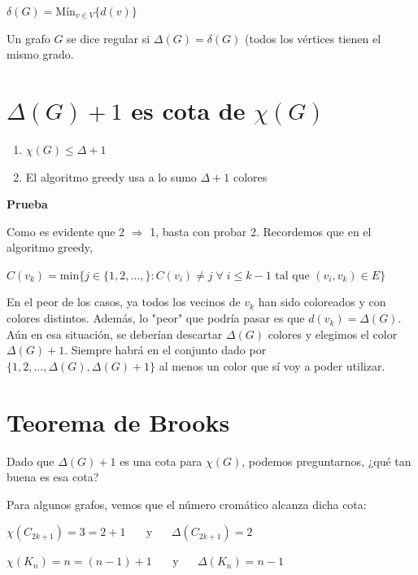 \documentclass[10pt,a4paper]{article}
\begin{document}
\begin{center}
$\delta(G) = \text{Mín}_{v \in V}\{d(v)\}$
\end{center}

Un grafo $G$ se dice regular si $\Delta(G) = \delta(G)$ (todos los vértices tienen el mismo grado.

\section*{$\Delta(G) + 1$ es cota de $\chi(G)$}

\begin{enumerate}

	\item $\chi(G) \leq \Delta + 1$
	\item El algoritmo greedy usa a lo sumo $\Delta + 1$ colores
\end{enumerate}

\textbf{Prueba}

Como es evidente que 2 $\Rightarrow$ 1, basta con probar 2. Recordemos que en el algoritmo greedy,

\begin{center}
$C(v_k) = \text{min}\{j \in \{1, 2, \dots, \} :C(v_i) \neq j\;\forall\; i \leq k -1 \text{ tal que } (v_i, v_k) \in E\}$
\end{center}

En el peor de los casos, ya todos los vecinos de $v_k$ han sido coloreados y con colores distintos. Además, lo "peor" que podría pasar es que $d(v_k)= \Delta(G)$. Aún en esa situación, se deberían descartar $\Delta(G)$ colores y elegimos el color $\Delta(G) + 1$. Siempre habrá en el conjunto dado por $\{1, 2, \dots, \Delta(G), \Delta(G) + 1\}$ al menos un color que sí voy a poder utilizar.

\section*{Teorema de Brooks}

Dado que $\Delta(G) + 1$ es una cota para $\chi(G)$, podemos preguntarnos, ¿qué tan buena es esa cota?

Para algunos grafos, vemos que el número cromático alcanza dicha cota:

\begin{center}
$\chi(C_{2k+1}) = 3 = 2 + 1$    y    $\Delta(C_{2k+1}) = 2$
\end{center}

\begin{center}
$\chi(K_n) = n = (n-1) + 1$    y    $\Delta(K_n) = n - 1$
\end{center}
\end{document}
